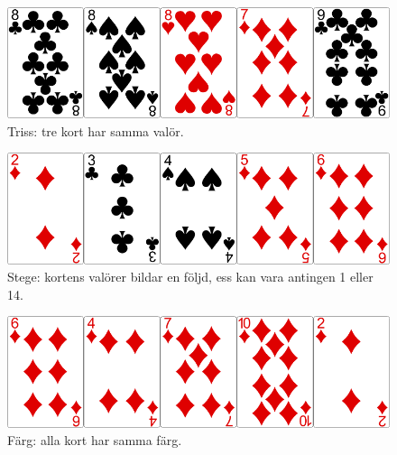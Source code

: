 \begin{figure}[H]
 \begin{minipage}[c]{\CardWidth}
  \includegraphics[width=\textwidth]{../img/w05-hands/trips.png}
 \end{minipage}
 \begin{minipage}[c]{\CardCaptionWidth}
  \caption{Triss: tre kort har samma valör.}
 \end{minipage}
\end{figure}

\begin{figure}[H]
 \begin{minipage}[c]{\CardWidth}
  \includegraphics[width=\textwidth]{../img/w05-hands/straight.png}
 \end{minipage}
 \begin{minipage}[c]{\CardCaptionWidth}
  \caption{Stege: kortens valörer bildar en följd, ess kan vara antingen 1 eller 14.}
 \end{minipage}
\end{figure}

\begin{figure}[H]
 \begin{minipage}[c]{\CardWidth}
  \includegraphics[width=\textwidth]{../img/w05-hands/flush.png}
 \end{minipage}
 \begin{minipage}[c]{\CardCaptionWidth}
  \caption{Färg: alla kort har samma färg.}
 \end{minipage}
\end{figure}

